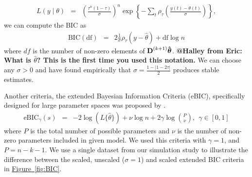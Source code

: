 \documentclass[12pt]{article}
\makeatletter
\newcommand{\Halley}[2]{{\bf {\color{purple}@Halley from #1: #2}}\xspace}
\newcommand{\Fig}[1]{\hyperref[fig:#1]{Figure~\ref*{fig:#1}}} %
\newcommand{\Fig}[1]{{Figure~\ref{fig:#1}}} %
\newcommand{\Vhat}[1]{{\bm{\hat \mathbf{\MakeLowercase{#1}}}}} %
\newcommand{\M}[1]{{\bm{\mathbf{\MakeUppercase{#1}}}}} %
\newcommand{\Mn}[2]{\M{#1}^{(#2)}} %
\makeatother
\begin{document}
	\begin{eqnarray*}
	L(y \mid \theta) & = & \left(\frac{\tau^n(1-\tau)}{\sigma}\right)^n\exp\left\{-\sum_t\rho_\tau\left(\frac{y(t) - \theta(t)}{\sigma}\right)\right\},
	\end{eqnarray*} 
	we can compute the BIC as 
	\begin{eqnarray*}
	\mbox{BIC}(\mbox{df}) & = & 2\frac{1}{\sigma}\rho_{\tau}(y-\hat{\theta}) + \mbox{df}\log n
	\end{eqnarray*} 
	where $df$ is the number of non-zero elements of $\Mn{D}{k+1}\Vhat{\theta}$.  \Halley{Eric}{What is $\hat{\theta}$? This is the first time you used this notation.} We can choose any $\sigma>0$ and have found empirically that $\sigma =  \frac{1-\lvert 1-2\tau\rvert}{2}$ produces stable estimates. 
	
	Another criteria, the extended Bayesian Information Criteria (eBIC), specifically designed for large parameter spaces was proposed by \cite{chen2008}. 
	\begin{eqnarray*}
	\label{eq:eBIC}
	\mbox{eBIC}_{\gamma}(s) & = & -2\log(L\{\hat{\theta}\}) + \nu\log n  + 2\gamma\log{P \choose \nu},~~\gamma \in [0,1]
	\end{eqnarray*}
	where $P$ is the total number of possible parameters and $\nu$ is the number of non-zero parameters included in given model. We used this criteria with $\gamma = 1$, and $P=n-k-1$. We use a single dataset from our simulation study to illustrate the difference between the scaled, unscaled ($\sigma = 1$) and scaled extended BIC criteria in \Fig{BIC}. 
	
\end{document}
